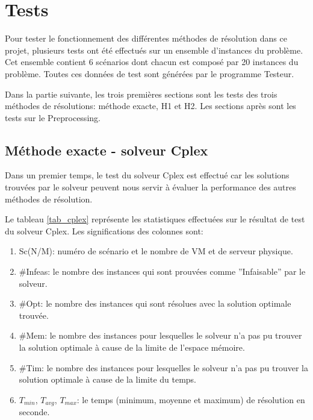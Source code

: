 \chapter{Tests}
Pour tester le fonctionnement des différentes méthodes de résolution dans ce projet, plusieurs tests ont été effectués sur un ensemble d'instances du problème. Cet ensemble contient 6 scénarios dont chacun est composé par 20 instances du problème. Toutes ces données de test sont générées par le programme Testeur.

Dans la partie suivante, les trois premières sections sont les tests des trois méthodes de résolutions: méthode exacte, H1 et H2. Les sections après sont les tests sur le Preprocessing.

\section{Méthode exacte - solveur Cplex}
Dans un premier temps, le test du solveur Cplex est effectué car les solutions trouvées par le solveur peuvent nous servir à évaluer la performance des autres méthodes de résolution.

Le tableau \ref{tab_cplex} représente les statistiques effectuées sur le résultat de test du solveur Cplex. Les significations des colonnes sont:
\begin{enumerate}
	\item Sc(N/M): numéro de scénario et le nombre de VM et de serveur physique.
	\item \#Infeas: le nombre des instances qui sont prouvées comme ''Infaisable'' par le solveur.
	\item \#Opt: le nombre des instances qui sont résolues avec la solution optimale trouvée.
	\item \#Mem: le nombre des instances pour lesquelles le solveur n'a pas pu trouver la solution optimale à cause de la limite de l'espace mémoire.
	\item \#Tim: le nombre des instances pour lesquelles le solveur n'a pas pu trouver la solution optimale à cause de la limite du temps.
	\item $T_{min}$, $T_{avg}$, $T_{max}$: le temps (minimum, moyenne et maximum) de résolution en seconde.
\end{enumerate}
\bigskip

